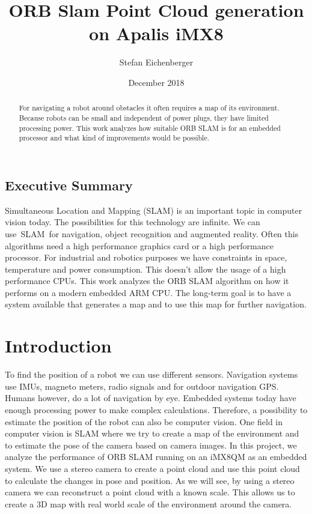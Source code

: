 \documentclass[11pt,a4paper,titlepage,oneside]{report}
\title{ORB Slam Point Cloud generation on Apalis iMX8}
\author{Stefan Eichenberger}
\date{December 2018}
\begin{document}
\maketitle

\begin{abstract}
	For navigating a robot around obstacles it often requires a map of its environment. Because robots can be small and independent of power plugs, they have limited processing power. This work analyzes how suitable ORB SLAM is for an embedded processor and what kind of improvements would be possible.
\end{abstract}

\section*{Executive Summary}
Simultaneous Location and Mapping (SLAM) is an important topic in computer vision today. The possibilities for this technology are infinite. We can use SLAM for navigation, object recognition and augmented reality. Often this algorithms need a high performance graphics card or a high performance processor. For industrial and robotics purposes we have constraints in space, temperature and power consumption. This doesn’t allow the usage of a high performance CPUs. This work analyzes the ORB SLAM algorithm on how it performs on a modern embedded ARM CPU. The long-term goal is to have a system available that generates a map and to use this map for further navigation.

\tableofcontents

\chapter{Introduction}
To find the position of a robot we can use different sensors. Navigation systems use IMUs, magneto meters, radio signals and for outdoor navigation GPS. Humans however, do a lot of navigation by eye. Embedded systems today have enough processing power to make complex calculations. Therefore, a possibility to estimate the position of the robot can also be computer vision. One field in computer vision is SLAM where we try to create a map of the environment and to estimate the pose of the camera based on camera images. In this project, we analyze the performance of ORB SLAM \cite{orbslam} running on an iMX8QM as an embedded system. We use a stereo camera to create a point cloud and use this point cloud to calculate the changes in pose and position. As we will see, by using a stereo camera we can reconstruct a point cloud with a known scale. This allows us to create a 3D map with real world scale of the environment around the camera.
\end{document}

